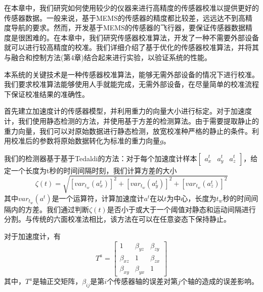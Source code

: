 \documentclass[
  type=master
]{gdutthesis}
\begin{document}
在本章中，我们研究如何使用较少的仪器来进行高精度的传感器校准以提供更好的传感器数据。一般来说，基于MEMS的传感器的精度都比较差，远远达不到高精度导航的要求。然而，开发基于MEMS的传感器的飞行器，要保证传感器数据精度是很困难的。在本章中，我们研究传感器校准算法，开发了一种不需要外部设备就可以进行较高精度的校准。我们详细介绍了基于优化的传感器校准算法，并将其与融合和控制方法(第4章)结合起来进行实验，以验证系统的性能。

本系统的关键技术是一种传感器校准算法，能够无需外部设备的情况下进行校准。我们要求校准算法能够使用人手就能完成，无需外部设备，在尽量简单的校准流程下保证校准结果的准确性。

首先建立加速度计的传感器模型，并利用重力的向量大小进行标定\cite{jekeli2012inertial}。对于加速度计，我们使用静态检测的方法\cite{fong2008methods}，并使用基于方差的检测算法\cite{sabatini2006wavelet}。由于需要提取静止的重力向量，我们可以对原始数据进行静态检测，放宽校准种严格的静止的条件。利用校准后的参数将原始数据转化为标准的重力向量$g$。

我们的检测器基于基于Tedaldi的方法：对于每个加速度计样本$\begin{bmatrix}
	a^t_x & a^t_y & a^t_z
\end{bmatrix}$，给定一个长度为t秒的时间间隔时刻，我们计算方差的大小
\begin{equation}\label{eq:var}
	\zeta(t)=\sqrt{[var_{t_w}(a^t_x)]^2+[var_{t_w}(a^t_y)]^2+[var_{t_w}(a^t_z)]^2}
\end{equation}
其中$var_{t_w}(a^t)$是一个运算符，计算加速度计$a^t$在以$t$为中心，长度为$t_w$秒的时间间隔内的方差。我们通过判断$\zeta(t)$是否小于或大于一个阈值对静态和运动间隔进行分割。与传统的六面校准法相比\cite{尹杭2014一种}，该方法在可以在任意姿态下保持静止。

对于加速度计，有
\begin{equation}\label{eq:axiserror}
	T^{a}=
	\begin{bmatrix}
		1 & \beta_{yz} & \beta_{zy}\\
		\beta_{xz} & 1 & \beta_{zx}\\
		\beta_{xy} & \beta_{yx} & 1
	\end{bmatrix}
\end{equation}
其中，$T^a$是轴正交矩阵，$\beta_{ij}$是第$i$个传感器轴的误差对第$j$个轴的造成的误差影响。
\end{document}
